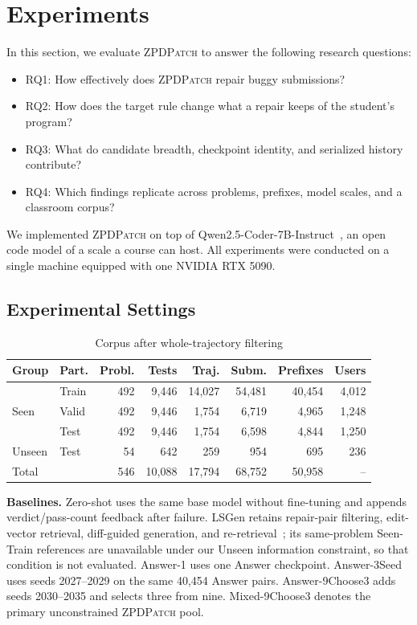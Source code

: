 \documentclass[10pt,conference]{IEEEtran}
\begin{document}
\section{Experiments}
\label{sec:experiment}
In this section, we evaluate \textsc{ZPDPatch} to answer the following research questions:
\begin{itemize}
\item RQ1: How effectively does \textsc{ZPDPatch} repair buggy submissions?
\item RQ2: How does the target rule change what a repair keeps of the student's program?
\item RQ3: What do candidate breadth, checkpoint identity, and serialized history contribute?
\item RQ4: Which findings replicate across problems, prefixes, model scales, and a classroom corpus?
\end{itemize}
We implemented \textsc{ZPDPatch} on top of Qwen2.5-Coder-7B-Instruct~\cite{hui2024qwen2}, an open code model of a scale a course can host. All experiments were conducted on a single machine equipped with one NVIDIA RTX 5090.

\subsection{Experimental Settings}


\begin{table}[t]
\caption{Corpus after whole-trajectory filtering}
\label{tab:data}
\centering\scriptsize\setlength{\tabcolsep}{2.5pt}
\begin{tabular}{ll||rrrrrr}
\toprule
Group & Part. & Probl. & Tests & Traj. & Subm. & Prefixes & Users \\
\midrule
\multirow{3}{*}{Seen} & Train & 492 & 9,446 & 14,027 & 54,481 & 40,454 & 4,012 \\
 & Valid & 492 & 9,446 & 1,754 & 6,719 & 4,965 & 1,248 \\
 & Test & 492 & 9,446 & 1,754 & 6,598 & 4,844 & 1,250 \\
Unseen & Test & 54 & 642 & 259 & 954 & 695 & 236 \\
\midrule
Total & & 546 & 10,088 & 17,794 & 68,752 & 50,958 & -- \\
\bottomrule
\end{tabular}
\end{table}

\noindent\textbf{Baselines.} Zero-shot uses the same base model without fine-tuning and appends verdict/pass-count feedback after failure. LSGen retains repair-pair filtering, edit-vector retrieval, diff-guided generation, and re-retrieval~\cite{dai2026learner}; its same-problem Seen-Train references are unavailable under our Unseen information constraint, so that condition is not evaluated. Answer-1 uses one Answer checkpoint. Answer-3Seed uses seeds 2027--2029 on the same 40,454 Answer pairs. Answer-9Choose3 adds seeds 2030--2035 and selects three from nine. Mixed-9Choose3 denotes the primary unconstrained \textsc{ZPDPatch} pool.
\end{document}
